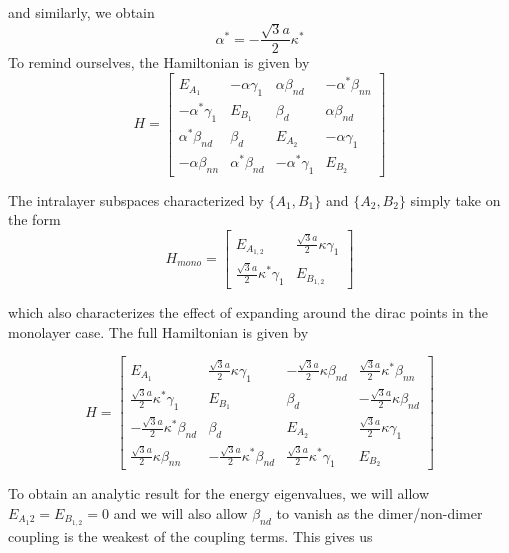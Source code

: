 \documentclass{article}
\begin{document}
and similarly, we obtain
\begin{equation}
\alpha^{*} = -\frac{\sqrt{3}a}{2}\kappa^{*}
\end{equation}
To remind ourselves, the Hamiltonian is given by
\begin{equation}
H =
\begin{bmatrix}
E_{A_{1}} & -\alpha\gamma_{1} & \alpha\beta_{nd} & -\alpha^{*}\beta_{nn}\\
-\alpha^{*}\gamma_{1} & E_{B_{1}} & \beta_{d} & \alpha\beta_{nd}\\
\alpha^{*}\beta_{nd} & \beta_{d} & E_{A_{2}} & -\alpha\gamma_{1} \\
-\alpha\beta_{nn} & \alpha^{*}\beta_{nd} & -\alpha^{*}\gamma_{1} & E_{B_{2}}
\end{bmatrix}
\end{equation}

The intralayer subspaces characterized by $\{A_{1}, B_{1}\}$ and $\{A_{2}, B_{2}\}$ simply take on the form
\begin{equation}
H_{mono} = \begin{bmatrix}
E_{A_{1,2}} & \frac{\sqrt{3}a}{2}\kappa\gamma_{1} \\
\frac{\sqrt{3}a}{2}\kappa^{*}\gamma_{1} & E_{B_{1,2}}
\end{bmatrix}
\end{equation}

which also characterizes the effect of expanding around the dirac points in the monolayer case. The full Hamiltonian is given by

\begin{equation}
H =
\begin{bmatrix}
E_{A_{1}} & \frac{\sqrt{3}a}{2}\kappa\gamma_{1} & -\frac{\sqrt{3}a}{2}\kappa\beta_{nd} & \frac{\sqrt{3}a}{2}\kappa^{*}\beta_{nn}\\
\frac{\sqrt{3}a}{2}\kappa^{*}\gamma_{1} & E_{B_{1}} & \beta_{d} & -\frac{\sqrt{3}a}{2}\kappa\beta_{nd}\\
-\frac{\sqrt{3}a}{2}\kappa^{*}\beta_{nd} & \beta_{d} & E_{A_{2}} & \frac{\sqrt{3}a}{2}\kappa\gamma_{1} \\
\frac{\sqrt{3}a}{2}\kappa\beta_{nn} & -\frac{\sqrt{3}a}{2}\kappa^{*}\beta_{nd} & \frac{\sqrt{3}a}{2}\kappa^{*}\gamma_{1}& E_{B_{2}}
\end{bmatrix}
\end{equation}

To obtain an analytic result for the energy eigenvalues, we will allow $E_{A_{1}{2}} = E_{B_{1,2}} = 0$ and we will also
allow $\beta_{nd}$ to vanish as the dimer/non-dimer coupling is the weakest of the coupling terms. This gives us
\end{document}
